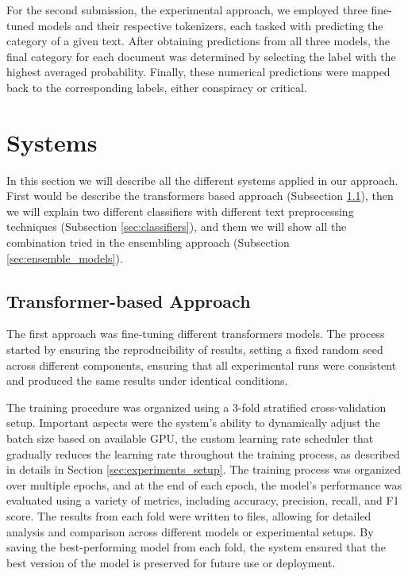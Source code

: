 \documentclass{Configuration_Files/PoliMi3i_thesis}
\begin{document}
For the second submission, the experimental approach, we employed three fine-tuned models and their respective tokenizers, each tasked with predicting the category of a given text. After obtaining predictions from all three models, the final category for each document was determined by selecting the label with the highest averaged probability. Finally, these numerical predictions were mapped back to the corresponding labels, either conspiracy or critical.

\section{Systems} \label{sec:systems_T1}
In this section we will describe all the different systems applied in our approach. First would be describe the transformers based approach (Subsection \ref{sec:transformers_based}), then we will explain two different classifiers with different text preprocessing techniques (Subsection \ref{sec:classifiers}), and them we will show all the combination tried in the ensembling approach (Subsection \ref{sec:ensemble_models}).

\subsection{Transformer-based Approach} \label{sec:transformers_based}
The first approach was fine-tuning different transformers models. The process started by ensuring the reproducibility of results, setting a fixed random seed across different components, ensuring that all experimental runs were consistent and produced the same results under identical conditions.

The training procedure was organized using a 3-fold stratified cross-validation setup. Important aspects were the system's ability to dynamically adjust the batch size based on available GPU, the custom learning rate scheduler that gradually reduces the learning rate throughout the training process, as described in details in Section \ref{sec:experiments_setup}. The training process was organized over multiple epochs, and at the end of each epoch, the model's performance was evaluated using a variety of metrics, including accuracy, precision, recall, and F1 score. The results from each fold were written to files, allowing for detailed analysis and comparison across different models or experimental setups. By saving the best-performing model from each fold, the system ensured that the best version of the model is preserved for future use or deployment.
\end{document}
